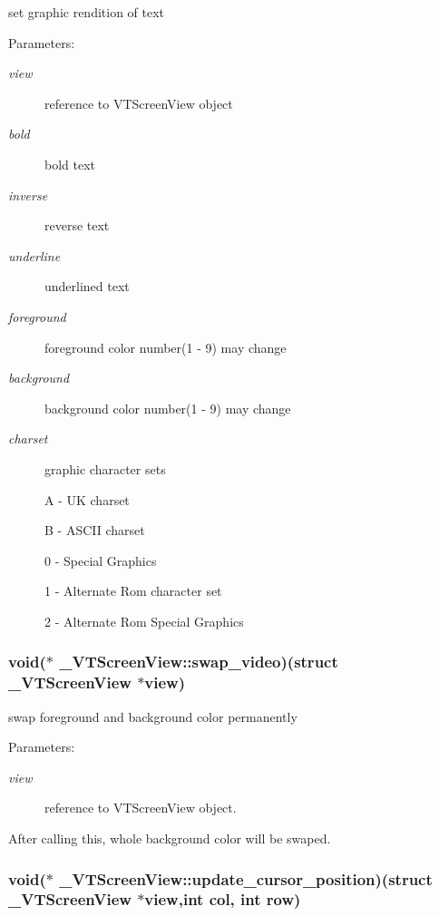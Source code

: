 set graphic rendition of text

\begin{Desc}
\item[Parameters:]
\begin{description}
\item[{\em view}]reference to VTScreen\-View object \item[{\em bold}]bold text \item[{\em inverse}]reverse text \item[{\em underline}]underlined text \item[{\em foreground}]foreground color number(1 - 9) may change \item[{\em background}]background color number(1 - 9) may change \item[{\em charset}]graphic character sets \par
 A - UK charset \par
 B - ASCII charset \par
 0 - Special Graphics \par
 1 - Alternate Rom character set \par
 2 - Alternate Rom Special Graphics \end{description}
\end{Desc}
\subsubsection{\setlength{\rightskip}{0pt plus 5cm}void($\ast$ \_\-VTScreen\-View::swap\_\-video)(struct \_\-VTScreen\-View $\ast$view)}\label{struct__VTScreenView_m5}


swap foreground and background color permanently

\begin{Desc}
\item[Parameters:]
\begin{description}
\item[{\em view}]reference to VTScreen\-View object.\end{description}
\end{Desc}
After calling this, whole background color will be swaped. 
\subsubsection{\setlength{\rightskip}{0pt plus 5cm}void($\ast$ \_\-VTScreen\-View::update\_\-cursor\_\-position)(struct \_\-VTScreen\-View $\ast$view,int col, int row)}\label{struct__VTScreenView_m2}


